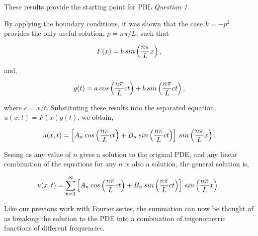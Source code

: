 \documentclass[12pt]{article}
\begin{document}
These results provide the starting point for PBL \textit{Question 1}. 

\vspace{4mm}

By applying the boundary conditions, it was shown that the case $k=-p^2$ provides the only useful solution, $p=n\pi/L$, such that

\vspace{2mm}

$$ F(x) = b\hspace{0.2em}sin\left(\frac{n\pi}{L}x\right), $$

and,

$$ g(t) = a\hspace{0.2em}cos\left(\frac{n\pi}{L}ct\right) + b\hspace{0.2em}sin\left(\frac{n\pi}{L}ct\right), $$

\vspace{4mm}

where $c=x/t$. Substituting these results into the separated equation, $u(x,t) = F(x)g(t)$, we obtain,

\vspace{2mm}

$$u(x,t) = \left[A_n\hspace{0.2em}cos\left(\frac{n\pi}{L}ct\right) + B_n\hspace{0.2em}sin\left(\frac{n\pi}{L}ct\right)\right]\hspace{0.2em}sin\left(\frac{n\pi}{L}x\right). $$

\vspace{4mm}

Seeing as any value of $n$ gives a solution to the original PDE, and any linear combination of the equations for any $n$ is also a solution, the general solution is,

\vspace{2mm}

$$u(x,t) = \sum_{n=1}^{\infty}\left[A_n\hspace{0.2em}cos\left(\frac{n\pi}{L}ct\right) + B_n\hspace{0.2em}sin\left(\frac{n\pi}{L}ct\right)\right]\hspace{0.2em}sin\left(\frac{n\pi}{L}x\right). $$

\vspace{4mm}

Like our previous work with Fourier series, the summation can now be thought of as breaking the solution to the PDE into a combination of trigonometric functions of different frequencies.
\end{document}
